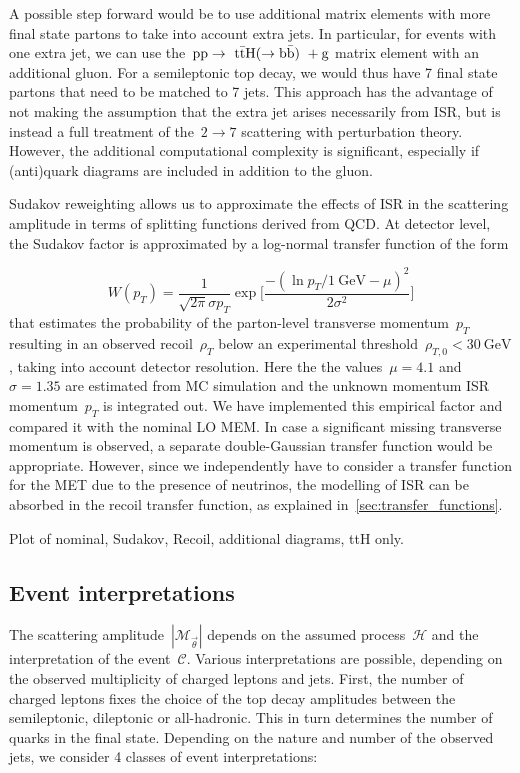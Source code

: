 A possible step forward would be to use additional matrix elements with more final state partons to take into account extra jets. In particular, for events with one extra jet, we can use the~$\mathrm{pp} \rightarrow~\mathrm{t} \bar{\mathrm{t}} \mathrm{H} (\rightarrow \mathrm{b}\bar{\mathrm{b}})~+ \mathrm{g}$ matrix element with an additional gluon. For a semileptonic top decay, we would thus have 7 final state partons that need to be matched to 7 jets. This approach has the advantage of not making the assumption that the extra jet arises necessarily from ISR, but is instead a full treatment of the~$2 \rightarrow 7$ scattering with perturbation theory. However, the additional computational complexity is significant, especially if (anti)quark diagrams are included in addition to the gluon.

Sudakov reweighting allows us to approximate the effects of ISR in the scattering amplitude in terms of splitting functions derived from QCD. At detector level, the Sudakov factor is approximated by a log-normal transfer function of the form

\begin{equation}
W(p_T) = \frac{1}{\sqrt{2\pi} \sigma p_T} \exp \biggl[ \frac{-(\ln{p_T/1~\mathrm{GeV}} - \mu)^2}{2\sigma^2}\biggr]
\end{equation}
that estimates the probability of the parton-level transverse momentum~$p_T$ resulting in an observed recoil~$\rho_T$ below an experimental threshold~$\rho_{T,0} < 30~\mathrm{GeV}$, taking into account detector resolution. Here the the values~$\mu = 4.1$ and~$\sigma = 1.35$ are estimated from MC simulation and the unknown momentum ISR momentum~$p_T$ is integrated out. We have implemented this empirical factor and compared it with the nominal LO MEM. In case a significant missing transverse momentum is observed, a separate double-Gaussian transfer function would be appropriate. However, since we independently have to consider a transfer function for the MET due to the presence of neutrinos, the modelling of ISR can be absorbed in the recoil transfer function, as explained in~\cref{sec:transfer_functions}.

\fixme Plot of nominal, Sudakov, Recoil, additional diagrams, ttH only.

\subsection{Event interpretations}
\label{sec:event_interpretation}

The scattering amplitude~$|\mathcal{M}_{\vec{\theta}}|$ depends on the assumed process~$\mathcal{H}$ and the interpretation of the event~$\mathcal{C}$. Various interpretations are possible, depending on the observed multiplicity of charged leptons and jets. First, the number of charged leptons fixes the choice of the top decay amplitudes between the semileptonic, dileptonic or all-hadronic. This in turn determines the number of quarks in the final state. Depending on the nature and number of the observed jets, we consider 4 classes of event interpretations:

